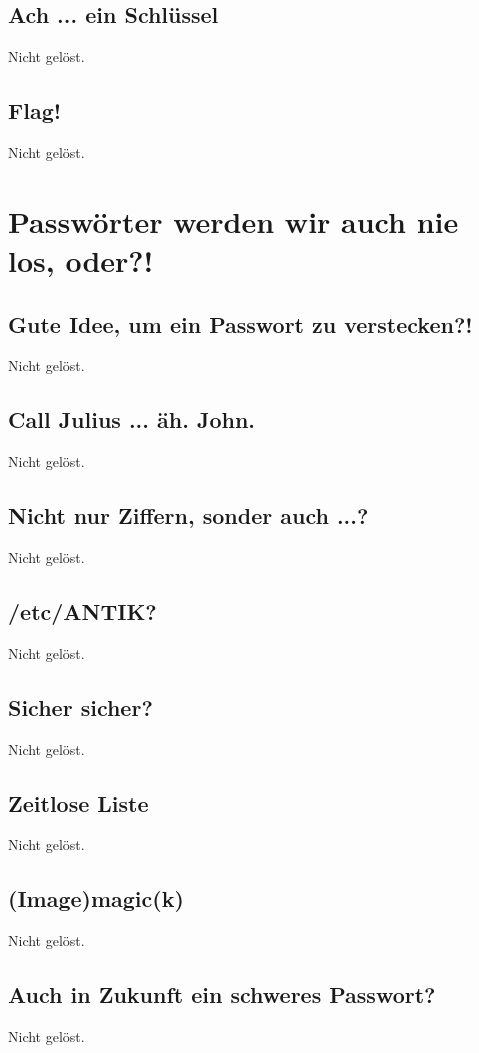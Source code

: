 \documentclass[12pt,a4paper,titlepage,oneside]{scrartcl}
\begin{document}
\subsection{Ach ... ein Schl\"ussel}
Nicht gelöst.

\subsection{Flag!}
Nicht gelöst.


\section{Passwörter werden wir auch nie los, oder?!}

\subsection{Gute Idee, um ein Passwort zu verstecken?!}
Nicht gelöst.

\subsection{Call Julius ... äh. John.}
Nicht gelöst.

\subsection{Nicht nur Ziffern, sonder auch ...?}
Nicht gelöst.

\subsection{/etc/ANTIK?}
Nicht gelöst.

\subsection{Sicher sicher?}
Nicht gelöst.

\subsection{Zeitlose Liste}
Nicht gelöst.

\subsection{(Image)magic(k)}
Nicht gelöst.

\subsection{Auch in Zukunft ein schweres Passwort?}
Nicht gelöst.
\end{document}
